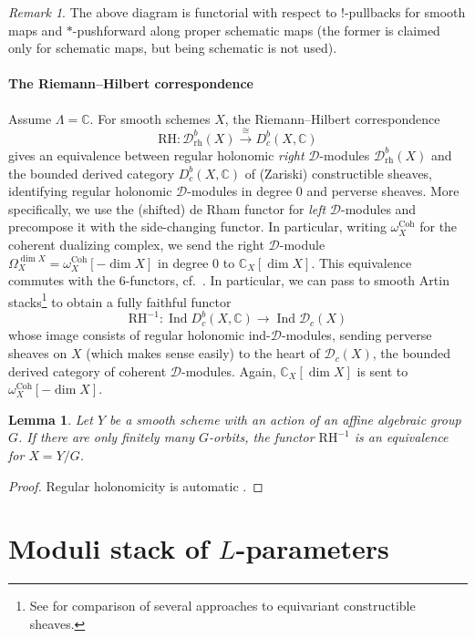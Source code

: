 \documentclass{amsart}
\newtheorem{lemma}[theorem]{Lemma}
\theoremstyle{definition}
\theoremstyle{remark}
\newtheorem{remark}[theorem]{Remark}
\numberwithin{equation}{section}
\DeclareMathOperator{\Ind}{Ind}
\newcommand{\mc}{\mathcal}
\newcommand{\bb}{\mathbb}
\newcommand{\C}{\mathbb{C}}
\newcommand{\RH}{\mathrm{RH}}
\newcommand{\Coh}{\mathrm{Coh}}
\begin{document}
\begin{remark}{\label{rem: Dmodulefunctoriality}}
The above diagram is functorial with respect to $!$-pullbacks for smooth maps and $*$-pushforward along proper schematic maps \cite[Theorem 3.4.9]{Chen2023categorical} (the former is claimed only for schematic maps, but being schematic is not used). 
\end{remark}

\subsection{The Riemann--Hilbert correspondence}
Assume $\Lambda=\C$. For smooth schemes $X$, the Riemann--Hilbert correspondence
\[
\RH\colon\mc{D}_{\mathrm{rh}}^b(X) \xrightarrow{\cong}    D_c^b(X, \C)
\] 
gives an equivalence between regular holonomic \emph{right} $\mc D$-modules $\mc{D}^b_{\mathrm{rh}}(X)$ and the bounded derived category $D_c^b (X, \C)$ of (Zariski) constructible sheaves, identifying regular holonomic $\mc D$-modules in degree 0 and  perverse sheaves. More specifically, we use the (shifted) de Rham functor for \emph{left} $\mc D$-modules and precompose it with the side-changing functor. In particular, writing $\omega_X^\Coh$ for the coherent dualizing complex, we send the right $\mc D$-module $\Omega_X^{\dim X}=\omega_X^{\Coh} [-\dim X]$ in degree 0 to $\bb C_X[\dim X]$. This equivalence commutes with the 6-functors, cf.~\cite{Paulin}. In particular, we can pass to smooth Artin stacks\footnote{See \cite{Vooys} for comparison of several approaches to equivariant constructible sheaves.} to obtain a fully faithful functor
\[
\RH^{-1}\colon \Ind D_c^b(X, \C) \to \Ind \mc{D}_c(X)
\]
whose image consists of regular holonomic ind-$\mc D$-modules, 
sending perverse sheaves on $X$ (which makes sense easily) to the heart of $\mc{D}_c(X)$, the bounded derived category of coherent $\mc D$-modules. Again, $\bb C_X[\dim X]$ is sent to $\omega_X^{\Coh} [-\dim X]$. 

\begin{lemma}
Let $Y$ be a smooth scheme with an action of an affine algebraic group $G$.
If there are only finitely many $G$-orbits, the functor $\RH^{-1}$ is an equivalence for $X=Y/G$. 
\end{lemma}

\begin{proof}
Regular holonomicity is automatic \cite[Theorem 11.6.1]{HottaTakeuchiTanisaki}. 
\end{proof}

\part{Moduli stack of \texorpdfstring{$L$}{L}-parameters}{\label{p: moduliofLparams}}
\end{document}

